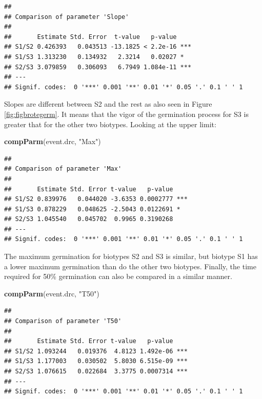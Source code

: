 \documentclass[letterpaper,]{book}
\newenvironment{Shaded}{\begin{snugshade}}{\end{snugshade}}
\newcommand{\KeywordTok}[1]{\textcolor[rgb]{0.13,0.29,0.53}{\textbf{#1}}}
\newcommand{\NormalTok}[1]{#1}
\newcommand{\StringTok}[1]{\textcolor[rgb]{0.31,0.60,0.02}{#1}}
\begin{document}
\begin{verbatim}
## 
## Comparison of parameter 'Slope' 
## 
##       Estimate Std. Error  t-value   p-value    
## S1/S2 0.426393   0.043513 -13.1825 < 2.2e-16 ***
## S1/S3 1.313230   0.134932   2.3214   0.02027 *  
## S2/S3 3.079859   0.306093   6.7949 1.084e-11 ***
## ---
## Signif. codes:  0 '***' 0.001 '**' 0.01 '*' 0.05 '.' 0.1 ' ' 1
\end{verbatim}

Slopes are different between S2 and the rest as also seen in Figure \ref{fig:figbrotegerm}. It means that the vigor of the germination process for S3 is greater that for the other two biotypes. Looking at the upper limit:

\begin{Shaded}
\begin{Highlighting}[]
\KeywordTok{compParm}\NormalTok{(event.drc, }\StringTok{"Max"}\NormalTok{)}
\end{Highlighting}
\end{Shaded}

\begin{verbatim}
## 
## Comparison of parameter 'Max' 
## 
##       Estimate Std. Error t-value   p-value    
## S1/S2 0.839976   0.044020 -3.6353 0.0002777 ***
## S1/S3 0.878229   0.048625 -2.5043 0.0122691 *  
## S2/S3 1.045540   0.045702  0.9965 0.3190268    
## ---
## Signif. codes:  0 '***' 0.001 '**' 0.01 '*' 0.05 '.' 0.1 ' ' 1
\end{verbatim}

The maximum germination for biotypes S2 and S3 is similar, but biotype S1 has a lower maximum germination than do the other two biotypes. Finally, the time required for 50\% germination can also be compared in a similar manner.

\begin{Shaded}
\begin{Highlighting}[]
\KeywordTok{compParm}\NormalTok{(event.drc, }\StringTok{"T50"}\NormalTok{)}
\end{Highlighting}
\end{Shaded}

\begin{verbatim}
## 
## Comparison of parameter 'T50' 
## 
##       Estimate Std. Error t-value   p-value    
## S1/S2 1.093244   0.019376  4.8123 1.492e-06 ***
## S1/S3 1.177003   0.030502  5.8030 6.515e-09 ***
## S2/S3 1.076615   0.022684  3.3775 0.0007314 ***
## ---
## Signif. codes:  0 '***' 0.001 '**' 0.01 '*' 0.05 '.' 0.1 ' ' 1
\end{verbatim}
\end{document}
